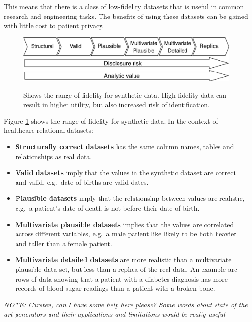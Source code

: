 \documentclass[11pt]{article}
\begin{document}
This means that there is a class of low-fidelity datasets that is useful in common research and engineering tasks. The benefits of using these datasets can be gained with little cost to patient privacy. 

\begin{figure}[ht]
\caption{Shows the range of fidelity for synthetic data. High fidelity data can result in higher utility, but also increased risk of identification.}
\centering
\includegraphics[width=0.8\linewidth]{figures/ONS.png}
\label{fig:Range of fidelity for synthetic data}
\end{figure}

Figure \ref{fig:Range of fidelity for synthetic data} shows the range of fidelity for synthetic data. In the context of healthcare relational datasets: 

\begin{itemize}
    \item \textbf{Structurally correct datasets} has the same column names, tables and relationships as real data. 
    \item \textbf{Valid datasets} imply that the values in the synthetic dataset are correct and valid, e.g.\ date of births are valid dates. 
    \item \textbf{Plausible datasets} imply that the relationship between values are realistic, e.g.\ a patient's date of death is not before their date of birth.
    \item \textbf{Multivariate plausible datasets} implies that the values are correlated across different variables, e.g.\ a male patient like likely to be both heavier and taller than a female patient. 
    \item \textbf{Multivariate detailed datasets} are more realistic than a multivariate plausible data set, but less than a replica of the real data. An example are rows of data showing that a patient with a diabetes diagnosis has more records of blood sugar readings than a patient with a broken bone.
\end{itemize}

\textit{NOTE: Carsten, can I have some help here please? Some words about state of the art generators and their applications and limitations would be really useful}
\end{document}

